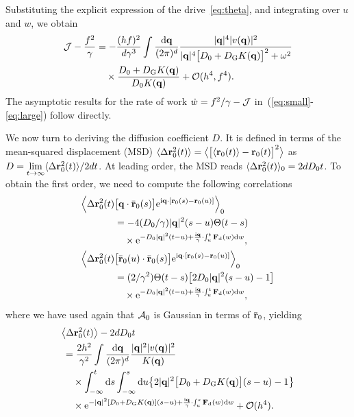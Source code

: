 \documentclass[superscriptaddress, twocolumn, prx, longbibliography, nofootinbib]{revtex4-1}
\begin{document}
Substituting the explicit expression of the drive~\eqref{eq:theta}, and integrating over $u$ and $w$, we obtain
\begin{equation}
	\begin{aligned}
		{\cal J} - \frac{f^2}{\gamma} &= - \frac{(hf)^2}{d\gamma^3} \int \frac{{\rm d}{\bf q}}{(2\pi)^d} \frac{|{\bf q}|^4 |v({\bf q})|^2}{|{\bf q}|^4\big[D_0+D_{\rm G}K({\bf q})\big]^2 + \omega^2}
		\\
		&\quad\times \frac{D_0+D_{\rm G}K({\bf q})}{D_0K({\bf q})} + {\cal O}(h^4,f^4) .
	\end{aligned}
\end{equation}
The asymptotic results for the rate of work $\dot w = f^2/\gamma-{\cal J}$ in~(\ref{eq:small}-\ref{eq:large}) follow directly.


We now turn to deriving the diffusion coefficient $D$. It is defined in terms of the mean-squared displacement (MSD) $\langle\Delta{\bf r}_0^2(t)\rangle=\big\langle\big[\langle{\bf r}_0(t)\rangle - {\bf r}_0(t)\big]^2\big\rangle$ as $D=\underset{t\to\infty}{\lim}\langle\Delta{\bf r}_0^2(t)\rangle / 2 d t$. At leading order, the MSD reads $\langle\Delta{\bf r}_0^2(t)\rangle_0 = 2dD_0t$. To obtain the first order, we need to compute the following correlations
\begin{equation}
	\begin{aligned}
		\Big\langle\Delta{\bf r}^2_0(t)& \big[{\bf q}\cdot\bar{\bf r}_0(s)\big] {\rm e}^{{\rm i}{\bf q}\cdot[{\bf r}_0(s)-{\bf r}_0(u)]}\Big\rangle_0
		\\
		&= - 4 (D_0/\gamma)|{\bf q}|^2(s-u) \Theta(t-s)
		\\
		&\quad\times{\rm e}^{ - D_0|{\bf q}|^2(t-u) + \frac{{\rm i}{\bf q}}{\gamma}\cdot\int_u^t {\bf F}_{\rm d}(w) {\rm d}w},
		\\
		\Big\langle\Delta{\bf r}^2_0(t)& \big[\bar{\bf r}_0(u)\cdot\bar{\bf r}_0(s)\big] {\rm e}^{{\rm i}{\bf q}\cdot[{\bf r}_0(s)-{\bf r}_0(u)]}\Big\rangle_0
		\\
		&= (2/\gamma^2)\Theta(t-s) \big[2D_0|{\bf q}|^2(s-u)-1\big]
		\\
		&\quad\times{\rm e}^{ - D_0|{\bf q}|^2(t-u) + \frac{{\rm i}{\bf q}}{\gamma}\cdot\int_u^t {\bf F}_{\rm d}(w) {\rm d}w} ,
	\end{aligned}
\end{equation}
where we have used again that ${\cal A}_0$ is Gaussian in terms of $\bar{\bf r}_0$, yielding
\begin{equation}
	\begin{aligned}
		&\big\langle\Delta{\bf r}^2_0(t)\big\rangle - 2 d D_0 t
		\\
		&\,= \frac{2h^2}{\gamma^2} \int \frac{{\rm d}{\bf q}}{(2\pi)^d} \frac{|{\bf q}|^2 |v({\bf q})|^2}{K({\bf q})}
		\\
		&\,\quad\times \int_{-\infty}^t{\rm d}s \int_{-\infty}^s{\rm d}u \big\{ 2|{\bf q}|^2\big[D_0+D_{\rm G}K({\bf q})\big](s-u) - 1\big\}
		\\
		&\,\quad\times {\rm e}^{ -|{\bf q}|^2[D_0+D_{\rm G}K({\bf q})](s-u) + \frac{{\rm i}{\bf q}}{\gamma}\cdot\int_u^s{\bf F}_{\rm d}(w) {\rm d}w } + {\cal O}(h^4) .
	\end{aligned}
\end{equation}
\end{document}
